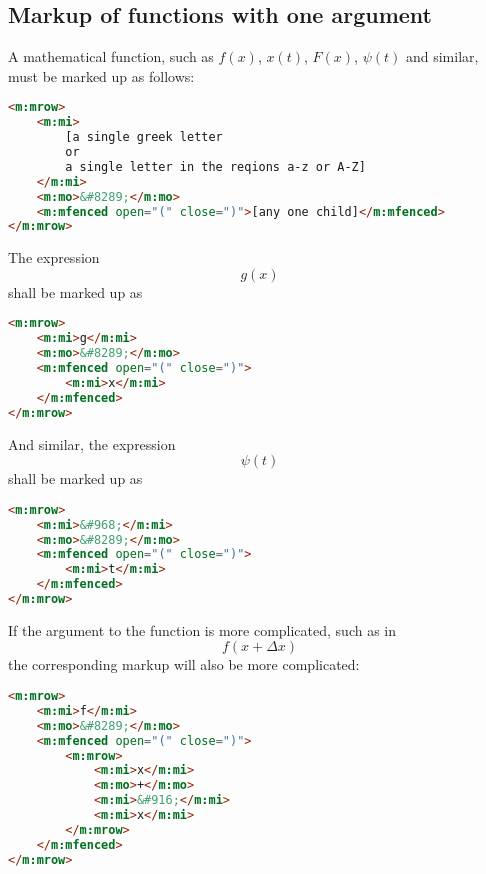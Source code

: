 \documentclass[english,a4paper,11pt]{article}
\begin{document}
\subsection{Markup of functions with one argument}
A mathematical function, such as $f(x)$, $x(t)$, $F(x)$, $\psi (t)$ and similar, must be marked up as follows:
\begin{lstlisting}[language=HTML]
<m:mrow>
	<m:mi>
		[a single greek letter 
		or 
		a single letter in the reqions a-z or A-Z]
	</m:mi>
	<m:mo>&#8289;</m:mo>
	<m:mfenced open="(" close=")">[any one child]</m:mfenced>
</m:mrow>
\end{lstlisting}


\begin{eksempler}
	The expression 
	\begin{equation}g(x)\end{equation}
	shall be marked up as
\begin{lstlisting}[language=HTML]
<m:mrow>
	<m:mi>g</m:mi>
	<m:mo>&#8289;</m:mo>
	<m:mfenced open="(" close=")">
		<m:mi>x</m:mi>
	</m:mfenced>
</m:mrow>
\end{lstlisting}

And similar, the expression 
\begin{equation}\psi(t)\end{equation}
shall be marked up as
\begin{lstlisting}[language=HTML]
<m:mrow>
	<m:mi>&#968;</m:mi>
	<m:mo>&#8289;</m:mo>
	<m:mfenced open="(" close=")">
		<m:mi>t</m:mi>
	</m:mfenced>
</m:mrow>
\end{lstlisting}

If the argument to the function is more complicated, such as in 
\begin{equation}f(x + \Delta x)\end{equation} 
the corresponding markup will also be more complicated:
\begin{lstlisting}[language=HTML]
<m:mrow>
	<m:mi>f</m:mi>
	<m:mo>&#8289;</m:mo>
	<m:mfenced open="(" close=")">
		<m:mrow>
			<m:mi>x</m:mi>
			<m:mo>+</m:mo>
			<m:mi>&#916;</m:mi>
			<m:mi>x</m:mi>
		</m:mrow>
	</m:mfenced>
</m:mrow>
\end{lstlisting}

\end{eksempler}
\end{document}
